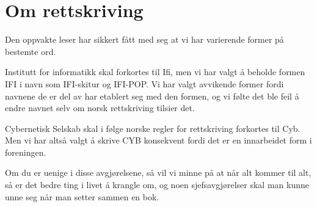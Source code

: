 \chapter*{Om rettskriving}

Den oppvakte leser har sikkert fått med seg at vi har varierende former på bestemte ord.

Institutt for informatikk skal forkortes til Ifi, men vi har valgt å beholde formen IFI i navn som IFI-skitur og IFI-POP. Vi har valgt avvikende former fordi navnene de er del av har etablert seg med den formen, og vi følte det ble feil å endre navnet selv om norsk rettskriving tilsier det. 

Cybernetisk Selskab skal i følge norske regler for rettskriving forkortes til Cyb. Men vi har altså valgt å skrive CYB konsekvent fordi det er en innarbeidet form i foreningen.

Om du er uenige i disse avgjørelsene, så vil vi minne på at når alt kommer til alt, så er det bedre ting i livet å krangle om, og noen sjefsavgjørelser skal man kunne unne seg når man setter sammen en bok.
